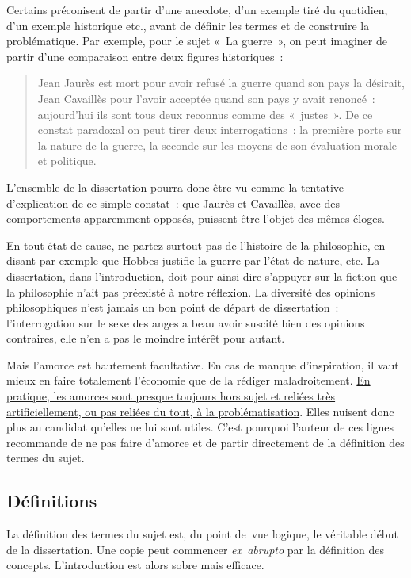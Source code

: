 \documentclass[a4paper,12pt]{article}
\begin{document}
Certains préconisent de partir d'une anecdote, d'un exemple tiré du
quotidien, d'un exemple historique etc., avant de définir les termes et
de construire la problématique. Par exemple, pour le sujet « La
guerre », on peut imaginer de partir d'une comparaison entre deux
figures historiques :
\begin{quote}
Jean Jaurès est mort pour avoir refusé la guerre quand son pays la
désirait, Jean Cavaillès pour l'avoir acceptée quand son pays y avait
renoncé : aujourd'hui ils sont tous deux reconnus comme des « justes ».
De ce constat paradoxal on peut tirer deux interrogations : la
première porte sur la nature de la guerre, la seconde sur les moyens
de son évaluation morale et politique.
\end{quote}
L'ensemble de la dissertation pourra donc être vu comme la tentative
d'explication de ce simple constat : que Jaurès et Cavaillès, avec des
comportements apparemment opposés, puissent être l'objet des mêmes
éloges.

En tout état de cause, \uline{ne partez surtout pas de l'histoire de la
philosophie}, en disant par exemple que Hobbes justifie la guerre par
l'état de nature, etc. La dissertation, dans l'introduction, doit pour
ainsi dire s'appuyer sur la fiction que la philosophie n'ait pas
préexisté à notre réflexion. La diversité des opinions philosophiques
n'est jamais un bon point de départ de dissertation : l'interrogation
sur le sexe des anges a beau avoir suscité bien des opinions contraires,
elle n'en a pas le moindre intérêt pour autant.

Mais l'amorce est hautement facultative. En cas de manque d'inspiration,
il vaut mieux en faire totalement l'économie que de la rédiger
maladroitement. \uline{En pratique, les amorces sont presque toujours hors
sujet et reliées très artificiellement, ou pas reliées du tout, à la
problématisation}. Elles nuisent donc plus au candidat qu'elles ne lui
sont utiles. C'est pourquoi l'auteur de ces lignes recommande de ne pas
faire d'amorce et de partir directement de la définition des termes du
sujet.


\subsection{Définitions}
\label{sec-2-2}
\label{definitions}

La définition des termes du sujet est, du point de vue logique, le
véritable début de la dissertation. Une copie peut commencer
\emph{ex abrupto} par la définition des concepts. L'introduction est alors
sobre mais efficace.
\end{document}
